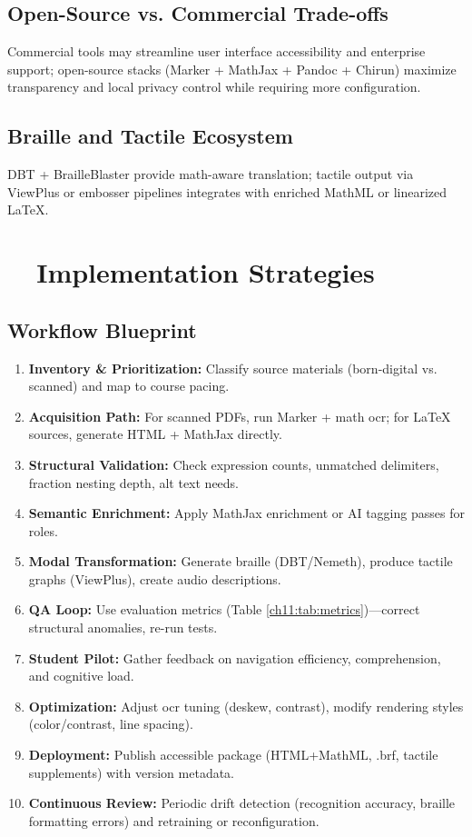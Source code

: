 \subsection{Open-Source vs. Commercial Trade-offs}
Commercial tools may streamline user interface accessibility and enterprise support; open-source stacks (Marker + MathJax + Pandoc + Chirun) maximize transparency and local privacy control while requiring more configuration.

\subsection{Braille and Tactile Ecosystem}
DBT + BrailleBlaster provide math-aware translation; tactile output via ViewPlus or embosser pipelines integrates with enriched \gls{MathML} or linearized LaTeX.\supercite{DuxburyDBT, BrailleBlaster, ViewPlusAGC}

\section{~~Implementation Strategies}\label{ch11:sec:implementation-strategies}

\subsection{Workflow Blueprint}
\begin{enumerate}
	\item \textbf{Inventory \& Prioritization:} Classify source materials (born-digital vs. scanned) and map to course pacing.
	\item \textbf{Acquisition Path:} For scanned PDFs, run Marker + math \gls{ocr}; for LaTeX sources, generate HTML + MathJax directly.\supercite{MarkerDocs}
	\item \textbf{Structural Validation:} Check expression counts, unmatched delimiters, fraction nesting depth, alt text needs.
	\item \textbf{Semantic Enrichment:} Apply MathJax enrichment or AI tagging passes for  roles.\supercite{MathJaxDocs}
	\item \textbf{Modal Transformation:} Generate braille (DBT/Nemeth), produce tactile graphs (ViewPlus), create audio descriptions.
	\item \textbf{QA Loop:} Use evaluation metrics (Table \ref{ch11:tab:metrics})—correct structural anomalies, re-run tests.
	\item \textbf{Student Pilot:} Gather feedback on navigation efficiency, comprehension, and cognitive load.
	\item \textbf{Optimization:} Adjust \gls{ocr} tuning (deskew, contrast), modify rendering styles (color/contrast, line spacing).
	\item \textbf{Deployment:} Publish accessible package (HTML+MathML, .brf, tactile supplements) with version metadata.
	\item \textbf{Continuous Review:} Periodic drift detection (recognition accuracy, braille formatting errors) and retraining or reconfiguration.
\end{enumerate}

